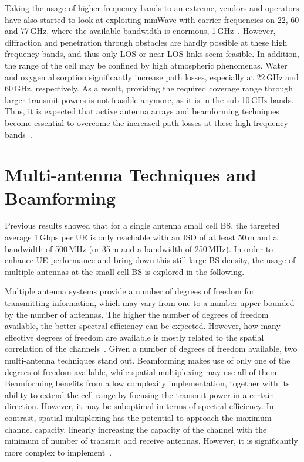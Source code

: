 \documentclass{IEEEtran}
\begin{document}
Taking the usage of higher frequency bands to an extreme,
vendors and operators have also started to look at exploiting mmWave with carrier frequencies on 22, 60 and 77\,GHz,
where the available bandwidth is enormous, 1\,GHz~\cite{5783993}.
However, diffraction and penetration through obstacles are hardly possible at these high frequency bands,
and thus only \ac{LOS} or near-\ac{LOS} links seem feasible.
In addition, the range of the cell may be confined by high atmospheric phenomenas.
Water and oxygen absorption significantly increase path losses,
especially at 22\,GHz and 60\,GHz, respectively.
As a result, providing the required coverage range through larger transmit powers is not feasible anymore,
as it is in the sub-10\,GHz bands.
Thus, it is expected that active antenna arrays and beamforming techniques
become essential to overcome the increased path losses at these high frequency bands~\cite{6736761}.


\section{Multi-antenna Techniques and Beamforming}
\label{Sec:MIMO}

Previous results showed that for a single antenna small cell \ac{BS},
the targeted average 1\,Gbps per \ac{UE} is only reachable with an \ac{ISD} of at least 50\,m and a bandwidth of 500\,MHz (or 35\,m and a bandwidth of 250\,MHz).
In order to enhance \ac{UE} performance and bring down this still large \ac{BS} density,
the usage of multiple antennas at the small cell \ac{BS} is explored in the following.

Multiple antenna systems provide a number of degrees of freedom for transmitting information,
which may vary from one to a number upper bounded by the number of antennas.
The higher the number of degrees of freedom available,
the better spectral efficiency can be expected.
However, how many effective degrees of freedom are available is mostly related to the spatial correlation of the channels~\cite{4274995}.
Given a number of degrees of freedom available,
two multi-antenna techniques stand out.
Beamforming makes use of only one of the degrees of freedom available,
while spatial multiplexing may use all of them.
Beamforming benefits from a low complexity implementation,
together with its ability to extend the cell range by focusing the transmit power in a certain direction.
However, it may be suboptimal in terms of spectral efficiency.
In contrast, spatial multiplexing has the potential to approach the maximum channel capacity,
linearly increasing the capacity of the channel with the minimum of number of transmit and receive antennas.
However, it is significantly more complex to implement~\cite{4274995}.
\end{document}
